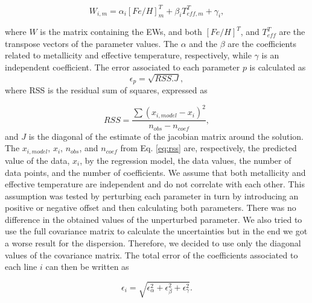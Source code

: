 \documentclass[referee]{aa}
\begin{document}
\begin{equation}
W_{i,m} = \alpha_{i}[Fe/H]_{m}^{T} + \beta_{i}T_{eff,m}^{T} + \gamma_{i}, %
\label{eq:fit}
\end{equation}

where $W$ is the matrix containing the EWs, and both $[Fe/H]^{T}$, and $T_{eff}^{T}$ are the transpose vectors of the parameter values. The $\alpha$ and the $\beta$ are the coefficients related to metallicity and effective temperature, respectively, while $\gamma$ is an independent coefficient. The error associated to each parameter $p$ is calculated as 
\begin{equation}
\label{eq:rss}
\epsilon_{p} = \sqrt{RSS.J},
\end{equation}
where RSS is the residual sum of squares, expressed as

\begin{equation}
RSS = \frac{\sum{(x_{i,model}-x_{i})^{2}}}{n_{obs}-n_{coef}},
\end{equation}
and $J$ is the diagonal of the estimate of the jacobian matrix around the solution. %
The $x_{i,model}$, $x_{i}$, $n_{obs}$, and $n_{coef}$ from Eq. \ref{eq:rss} are, respectively, the predicted value of the data, $x_{i}$, by the regression model, the data values, the number of data points, and the number of coefficients. We assume that both metallicity and effective temperature are independent and do not correlate with each other. This assumption was tested by perturbing each parameter in turn by introducing an positive or negative offset and then calculating both parameters. There was no difference in the obtained values of the unperturbed parameter. We also tried to use the full covariance matrix to calculate the uncertainties but in the end we got a worse result for the dispersion. Therefore, we decided to use only the diagonal values of the covariance matrix. The total error of the coefficients associated to each line $i$ can then be written as

\begin{equation} 
\epsilon_{i} = \sqrt{\epsilon_{\alpha}^{2}+\epsilon_{\beta}^{2}+\epsilon_{\gamma}^{2}}.
\end{equation}
\end{document}
